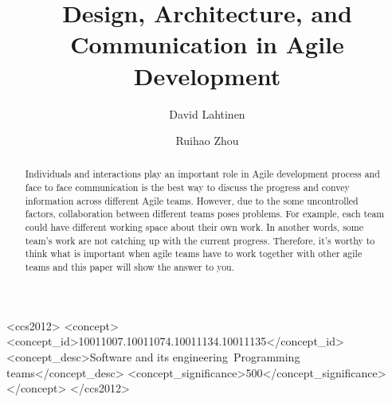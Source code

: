 \documentclass[sigplan,screen]{acmart}
\begin{document}
%
\title{Design, Architecture, and Communication in Agile Development}

%
\author{David Lahtinen}
\author{Ruihao Zhou}
\authornotemark[1]

%
\renewcommand{\shortauthors}{Trovato and Tobin, et al.}

%
\begin{abstract}
Individuals and interactions play an important role in Agile development process and face to face communication is the best way to discuss the progress and convey information across different Agile teams. However, due to the some uncontrolled factors, collaboration between different teams poses problems. For example, each team could have different working space about their own work. In another words, some team’s work are not catching up with the current progress. Therefore, it’s worthy to think what is important when agile teams have to work together with other agile teams and this paper will show the answer to you.
\end{abstract}

%
%
\begin{CCSXML}
<ccs2012>
  <concept>
    <concept_id>10011007.10011074.10011134.10011135</concept_id>
    <concept_desc>Software and its engineering~Programming teams</concept_desc>
    <concept_significance>500</concept_significance>
  </concept>
</ccs2012>
\end{CCSXML}


%
\end{document}
